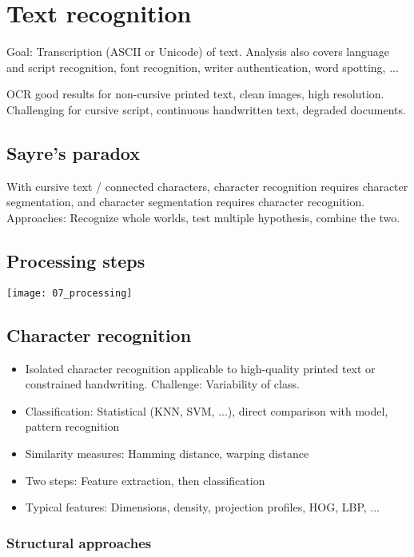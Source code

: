 \section{Text recognition}

Goal: Transcription (ASCII or Unicode) of text. Analysis also covers language
and script recognition, font recognition, writer authentication, word spotting,
...

OCR good results for non-cursive printed text, clean images, high resolution.
Challenging for cursive script, continuous handwritten text, degraded
documents.

\subsection{Sayre's paradox}

With cursive text / connected characters, character recognition requires
character segmentation, and character segmentation requires character
recognition. Approaches: Recognize whole worlds, test multiple hypothesis,
combine the two.

\subsection{Processing steps}

\texttt{[image: 07\_processing]}

\subsection{Character recognition}

\begin{itemize}
		\item Isolated character recognition applicable to high-quality printed
				text or constrained handwriting. Challenge: Variability of
				class.
		\item Classification: Statistical (KNN, SVM, ...), direct comparison
				with model, pattern recognition
		\item Similarity measures: Hamming distance, warping distance
		\item Two steps: Feature extraction, then classification
		\item Typical features: Dimensions, density, projection profiles, HOG,
				LBP, ...
\end{itemize}

\subsubsection{Structural approaches}

